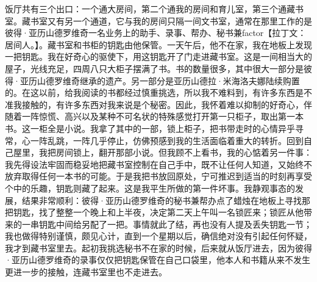 \documentclass[12pt, UTF8]{ctexbook}
\begin{document}
\par 饭厅共有三个出口：一个通大房间，第二个通我的房间和育儿室，第三个通藏书室。藏书室又有另一个通道，它与我的房间只隔一间文书室，通常在那里工作的是彼得·亚历山德罗维奇一名业务上的助手、录事、帮办、秘书兼factor【拉丁文：居间人。】。藏书室和书柜的钥匙由他保管。一天午后，他不在家，我在地板上发现一把钥匙。我在好奇心的驱使下，用这钥匙开了门走进藏书室。这是一间相当大的屋子，光线充足，四周八只大柜子摆满了书。书的数量很多，其中很大一部分是彼得·亚历山德罗维奇继承的遗产。另一部分是亚历山德拉·米海洛夫娜陆续购置的。在这以前，给我阅读的书都经过慎重挑选，所以我不难料到，有许多东西是不准我接触的，有许多东西对我来说是个秘密。因此，我怀着难以抑制的好奇心，伴随着一阵惊慌、高兴以及某种不可名状的特殊感觉打开第一只柜子，取出第一本书。这一柜全是小说。我拿了其中的一部，锁上柜子，把书带走时的心情异乎寻常，心一阵乱跳，一阵几乎停止，仿佛预感到我的生活面临着重大的转折。回到自己屋里，我把房间锁上，翻开那部小说。但我顾不上看书，我的心惦着另一件事：我先得设法牢固而稳妥地把藏书室控制在自己手中，既不让任何人知道，又始终不放弃取得任何一本书的可能。于是我把书放回原处，宁可推迟到适当的时刻再享受个中的乐趣，钥匙则藏了起来。这是我平生所做的第一件坏事。我静观事态的发展，结果非常顺利：彼得·亚历山德罗维奇的秘书兼帮办点了蜡烛在地板上寻找那把钥匙，找了整整一个晚上和上半夜，决定第二天上午叫一名锁匠来；锁匠从他带来的一串钥匙中间给另配了一把。事情就此了结，再也没有人提及丢失钥匙一节；我也做得特别谨慎，颇见心计，直到一个星期以后，确信绝对没有引起任何怀疑，我才到藏书室里去。起初我挑选秘书不在家的时候，后来就从饭厅进去，因为彼得·亚历山德罗维奇的录事仅仅把钥匙保管在自己口袋里，他本人和书籍从来不发生更进一步的接触，连藏书室里也不走进去。
\end{document}
